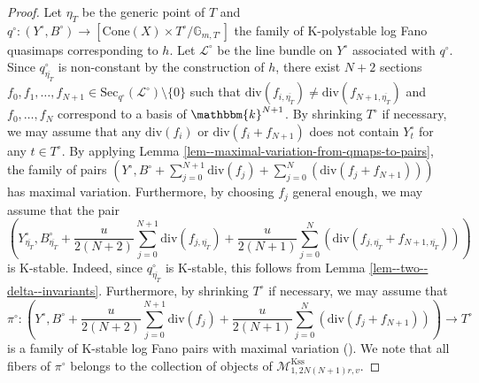 \documentclass[12pt,twoside]{amsart}
\theoremstyle{definition}
\begin{document}
\begin{proof}
Let $\eta_T$ be the generic point of $T$ and $q^\circ\colon(Y^\circ,B^\circ)\to[\mathrm{Cone}(X)\times T^\circ/\mathbb{G}_{m,T^\circ}]$ the family of K-polystable log Fano quasimaps corresponding to $h$.
Let $\mathscr{L}^\circ$ be the line bundle on $Y^\circ$ associated with $q^\circ$.
Since $q^\circ_{\overline{\eta_T}}$ is non-constant by the construction of $h$, there exist $N+2$ sections $f_0,f_1,\ldots,f_{N+1}\in\mathrm{Sec}_{q^\circ}(\mathscr{L}^\circ)\setminus\{0\}$ such that $\mathrm{div}(f_{i,\overline{\eta_T}})\ne \mathrm{div}(f_{N+1,\overline{\eta_T}})$ and $f_0,\ldots,f_N$ correspond to a basis of $\mathbbm{k}^{N+1}$. 
By shrinking $T^\circ$ if necessary, we may assume that any $\mathrm{div}(f_i)$ or $\mathrm{div}(f_i+f_{N+1})$ does not contain $Y^\circ_{t}$ for any $t\in T^\circ$.
By applying Lemma \ref{lem--maximal-variation-from-qmaps-to-pairs}, the family of pairs $(Y^\circ,B^\circ+\sum_{j=0}^{N+1}\mathrm{div}(f_j)+\sum_{j=0}^{N}(\mathrm{div}(f_j+f_{N+1})))$ has maximal variation.
Furthermore, by choosing $f_j$ general enough, we may assume that the pair $$\left(Y^\circ_{\overline{\eta_T}},B^\circ_{\overline{\eta_T}}+\frac{u}{2(N+2)}\sum^{N+1}_{j=0}\mathrm{div}(f_{j,\overline{\eta_T}})+\frac{u}{2(N+1)}\sum^{N}_{j=0}(\mathrm{div}(f_{j,\overline{\eta_T}}+f_{N+1,\overline{\eta_T}}))\right)$$
is K-stable.
Indeed, since $q^\circ_{\overline{\eta_T}}$ is K-stable, this follows from Lemma \ref{lem--two--delta--invariants}.
Furthermore, by shrinking $T^\circ$ if necessary, we may assume that 
$$\pi^\circ\colon\left(Y^\circ,B^\circ+\frac{u}{2(N+2)}\sum^{N+1}_{j=0}\mathrm{div}(f_{j})+\frac{u}{2(N+1)}\sum^{N}_{j=0}(\mathrm{div}(f_{j}+f_{N+1}))\right)\to T^\circ$$
is a family of K-stable log Fano pairs with maximal variation (\cite[Theorem A]{BL}).
We note that all fibers of $\pi^\circ$ belongs to the collection of objects of $\mathcal{M}^{\mathrm{Kss}}_{1,2N(N+1)r,v}$.
    

\end{proof}
\end{document}
